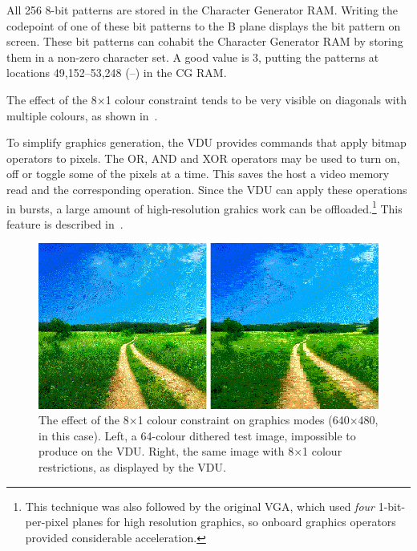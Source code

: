 All 256 8-bit patterns are stored in the Character Generator RAM. Writing the
codepoint of one of these bit patterns to the B plane displays the bit pattern
on screen. These bit patterns can cohabit the Character Generator RAM by
storing them in a non-zero  character set. A good value is 3,
putting the patterns at locations 49,152–53,248 (–) in the
CG RAM.

The effect of the 8×1 colour constraint tends to be very visible on diagonals
with multiple colours, as shown in~.

To simplify graphics generation, the VDU provides commands that apply bitmap
operators to pixels. The OR, AND and XOR operators may be used to turn on, off
or toggle some of the pixels at a time. This saves the host a video memory read
and the corresponding operation. Since the VDU can apply these operations in
bursts, a large amount of high-resolution grahics work can be
offloaded.\footnote{This technique was also followed by the original VGA, which
  used {\em four\/} 1-bit-per-pixel planes for high resolution graphics, so
  onboard graphics operators provided considerable acceleration.} This feature
is described in~.

\begin{figure}
  \centering
  \includegraphics[width=0.9\columnwidth]{../figs/colour-restrictions.png}%
  \caption[Effect of colour constraints]{\label{fig:colour-constraints}The
    effect of the 8×1 colour constraint on graphics modes (640×480, in this
    case). Left, a 64-colour dithered test image, impossible to produce on the
    VDU. Right, the same image with 8×1 colour restrictions, as displayed by
    the VDU.}
\end{figure}




